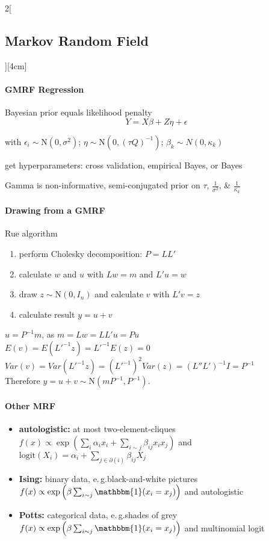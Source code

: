 \documentclass[8pt]{extarticle}
\begin{document}
\begin{multicols}{2}[\subsection{Markov Random Field}][4cm]
\paragraph{GMRF Regression} Bayesian prior equals likelihood penalty 
$$Y = X \beta + Z \eta + \epsilon$$

with  $\epsilon_i \sim \mathrm{N}(0, \sigma^2)$; $\eta \sim \mathrm{N}(0, (\tau Q)^{-1})$; $\beta_k \sim N (0, \kappa_k )$

\noindent get hyperparameters: cross validation, empirical Bayes, or Bayes 

\noindent Gamma is non-informative, semi-conjugated prior on $\tau$, $\frac{1}{\sigma^2}$, \& $\frac{1}{\kappa_k}$ 




\paragraph{Drawing from a GMRF} Rue algorithm
\begin{enumerate}[itemsep=-0.5em]
\item perform Cholesky decomposition: $P=LL'$ 
\item calculate $w$ and $u$ with $Lw=m$ and $L'u=w$
\item draw $z\sim\mathrm{N}(0,I_n)$ and calculate $v$ with $L'v=z$
\item calculate result $y=u+v$
\end{enumerate}

\begin{Proof}
$u=P^{-1}m$, as $m=Lw=LL'u=Pu  $ \\
$E(v)=E(L'^{-1}z)=L'^{-1}E(z)=0$ \\
$Var(v)=Var(L'^{-1}z){=}(L'^{-1})^2 Var(z){=}(L''L')^{-1}I=P^{-1}$ \\
Therefore $y = u+v\sim \mathrm{N}(mP^{-1}, P^{-1})$.
\end{Proof}

\paragraph{Other MRF}
\begin{itemize}
\item \textbf{autologistic:} at most two-element-cliques %
$f(x) \propto \exp\left(\sum_i \alpha_i x_i + \sum_{i\sim j}\beta_{ij}x_ix_j\right)$ and
$\mathrm{logit}(X_i) = \alpha_i + \sum_{j\in \partial(i)} \beta_{ij} X_j$

\item \textbf{Ising:} binary data, e.\,g.\@ black-and-white pictures
$f(x) \propto \exp\left(\beta \sum_{i\sim j} \mathbbm{1}(x_i=x_j)\right)$ and autologistic
\item \textbf{Potts:} categorical data, e.\,g.\@ shades of grey
$f(x) \propto \exp\left(\beta \sum_{i\sim j} \mathbbm{1}(x_i=x_j)\right)$ and multinomial logit
\end{itemize}




\end{multicols}
\end{document}
